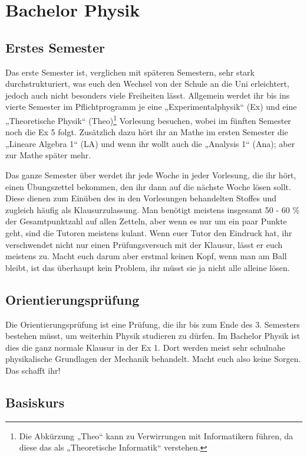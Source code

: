\section{Bachelor Physik}

\subsection{Erstes Semester}

Das erste Semester ist, verglichen mit späteren Semestern, sehr stark durchstrukturiert, was euch den Wechsel von der Schule an die Uni erleichtert, jedoch auch nicht besonders viele Freiheiten lässt.  Allgemein werdet ihr bis ins vierte Semester im Pflichtprogramm je eine „Experimentalphysik“ (\gls{Ex}) und eine „Theoretische Physik“ (\gls{Theo})\footnote{Die Abkürzung „Theo“ kann zu Verwirrungen mit Informatikern führen, da diese das als „Theoretische Informatik“ verstehen.} Vorlesung besuchen, wobei im fünften Semester noch die Ex 5 folgt. Zusätzlich dazu hört ihr an Mathe im ersten Semester die „Lineare Algebra 1“ (\gls{LA}) und wenn ihr wollt auch die „Analysis 1“ (\gls{Ana}); aber zur Mathe später mehr.

Das ganze Semester über werdet ihr jede Woche in jeder Vorlesung, die ihr hört, einen Übungszettel bekommen, den ihr dann auf die nächste Woche lösen sollt. Diese dienen zum Einüben des in den Vorlesungen behandelten Stoffes und zugleich häufig als Klausurzulassung. Man benötigt meistens insgesamt 50 - 60 \% der Gesamtpunktzahl auf allen Zetteln, aber wenn es nur um ein paar Punkte geht, sind die Tutoren meistens kulant. Wenn euer Tutor den Eindruck hat, ihr verschwendet nicht nur einen Prüfungsversuch mit der Klausur, lässt er euch meistens zu. Macht euch darum aber erstmal keinen Kopf, wenn man am Ball bleibt, ist das überhaupt kein Problem, ihr müsst sie ja nicht alle alleine lösen.

\subsection{Orientierungsprüfung}

Die Orientierungsprüfung ist eine Prüfung, die ihr bis zum Ende des 3. Semesters bestehen müsst, um weiterhin Physik studieren zu dürfen. Im Bachelor Physik ist dies die ganz normale Klausur in der Ex 1. Dort werden meist sehr schulnahe physikalische Grundlagen der Mechanik behandelt. Macht euch also keine Sorgen. Das schafft ihr!

\subsection{Basiskurs}

